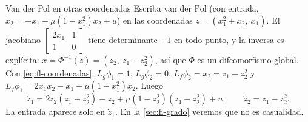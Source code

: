\begin{ejemplo}[label=ej:fl-coordvdp]{Van der Pol en otras coordenadas}
Escriba van der Pol (con entrada, $\dot x_2=-x_1+\mu(1-x_1^2)x_2+u$) en las coordenadas $z=(x_1^2+x_2,\ x_1)$.
\solucion El jacobiano $\begin{bmatrix}2x_1&1\\1&0\end{bmatrix}$ tiene determinante $-1$ en todo punto, y la inversa es explícita: $x=\Phi^{-1}(z)=(z_2,\ z_1-z_2^2)$, así que $\Phi$ es un difeomorfismo global. Con \eqref{eq:fl-coordenadas}: $L_g\phi_1=1$, $L_g\phi_2=0$, $L_f\phi_2=x_2=z_1-z_2^2$ y $L_f\phi_1=2x_1x_2-x_1+\mu(1-x_1^2)x_2$. Luego
\[
  \dot z_1=2z_2(z_1-z_2^2)-z_2+\mu(1-z_2^2)(z_1-z_2^2)+u,\qquad \dot z_2=z_1-z_2^2 .
\]
La entrada aparece solo en $\dot z_1$. En la \cref{sec:fl-grado} veremos que no es casualidad.
\end{ejemplo}

